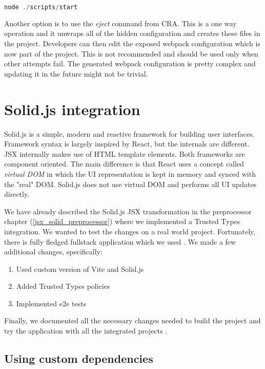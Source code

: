 \bigskip
\begin{lstlisting}[language=JavaScript, caption=Starting the CRA application]
node ./scripts/start
\end{lstlisting}

Another option is to use the \emph{eject} command from CRA. This is a one way operation and it
unwraps all of the hidden configuration and creates these files in the project. Developers can then
edit the exposed webpack configuration which is now part of the project. This is not recommended and
should be used only when other attempts fail. The generated webpack configuration is pretty complex
and updating it in the future might not be trivial.

\section{Solid.js integration}
\label{section:solid}

Solid.js is a simple, modern and reactive framework for building user interfaces. Framework
syntax is largely inspired by React, but the internals are different. JSX internally makes use of
HTML template elements. Both frameworks are component oriented. The main difference is that React
uses a concept called \emph{virtual DOM} in which the UI representation is kept in memory and synced
with the "real" DOM. Solid.js does not use virtual DOM and performs all UI updates directly.

We have already described the Solid.js JSX transformation in the preprocessor chapter
(\ref{jsx_solid_preprocessor}) where we implemented a Trusted Types integration. We wanted to test
the changes on a real world project. Fortunately, there is fully fledged fullstack application which
we used \cite{original_solid_realworld_project}. We made a few additional changes, specifically:

\begin{enumerate}
  \item Used custom version of Vite and Solid.js
  \item Added Trusted Types policies
  \item Implemented e2e tests
\end{enumerate}

Finally, we documented all the necessary changes needed to build the project and try the application
with all the integrated projects \cite{solid_realworld_project:readme}.

\subsection{Using custom dependencies}

